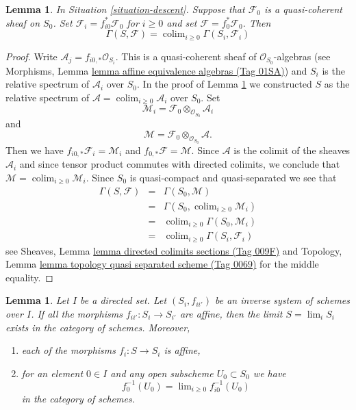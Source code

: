 \documentclass{amsart}
\theoremstyle{plain}
\newtheorem{lemma}[subsection]{Lemma}
\theoremstyle{definition}
\theoremstyle{remark}
\numberwithin{equation}{subsection}
\def\lim{\mathop{\mathrm{lim}}\nolimits}
\def\colim{\mathop{\mathrm{colim}}\nolimits}
\begin{document}
\begin{lemma}
\label{lemma-descend-section}
In Situation \ref{situation-descent}.
Suppose that $\mathcal{F}_0$ is a quasi-coherent sheaf on $S_0$.
Set $\mathcal{F}_i = f_{i0}^*\mathcal{F}_0$ for $i \geq 0$ and set
$\mathcal{F} = f_0^*\mathcal{F}_0$.
Then
$$
\Gamma(S, \mathcal{F}) = \colim_{i \geq 0} \Gamma(S_i, \mathcal{F}_i)
$$
\end{lemma}

\begin{proof}
Write $\mathcal{A}_j = f_{i0, *} \mathcal{O}_{S_i}$.
This is a quasi-coherent sheaf of $\mathcal{O}_{S_0}$-algebras
(see Morphisms, Lemma \href{https://stacks.math.columbia.edu/tag/01SA}{lemma affine equivalence algebras (Tag 01SA)})
and $S_i$ is the relative spectrum of $\mathcal{A}_i$ over $S_0$.
In the proof of Lemma \ref{lemma-directed-inverse-system-has-limit}
we constructed $S$ as the relative spectrum of
$\mathcal{A} = \colim_{i \geq 0} \mathcal{A}_i$
over $S_0$. Set
$$
\mathcal{M}_i = \mathcal{F}_0 \otimes_{\mathcal{O}_{S_0}} \mathcal{A}_i
$$
and
$$
\mathcal{M} = \mathcal{F}_0 \otimes_{\mathcal{O}_{S_0}} \mathcal{A}.
$$
Then we have $f_{i0, *} \mathcal{F}_i = \mathcal{M}_i$
and $f_{0, *}\mathcal{F} = \mathcal{M}$. Since $\mathcal{A}$
is the colimit of the sheaves $\mathcal{A}_i$ and since tensor
product commutes with directed colimits, we conclude that
$\mathcal{M} = \colim_{i \geq 0} \mathcal{M}_i$.
Since $S_0$ is quasi-compact and quasi-separated we see that
\begin{eqnarray*}
\Gamma(S, \mathcal{F})
& = &
\Gamma(S_0, \mathcal{M}) \\
& = &
\Gamma(S_0, \colim_{i \geq 0} \mathcal{M}_i) \\
& = &
\colim_{i \geq 0} \Gamma(S_0, \mathcal{M}_i) \\
& = &
\colim_{i \geq 0} \Gamma(S_i, \mathcal{F}_i)
\end{eqnarray*}
see Sheaves, Lemma \href{https://stacks.math.columbia.edu/tag/009F}{lemma directed colimits sections (Tag 009F)} and
Topology, Lemma \href{https://stacks.math.columbia.edu/tag/0069}{lemma topology quasi separated scheme (Tag 0069)}
for the middle equality.
\end{proof}


\begin{lemma}
\label{lemma-directed-inverse-system-has-limit}
Let $I$ be a directed set. Let $(S_i, f_{ii'})$ be an
inverse system of schemes over $I$. If all the morphisms
$f_{ii'} : S_i \to S_{i'}$ are affine, then the limit $S = \lim_i S_i$ exists
in the category of schemes. Moreover,
\begin{enumerate}
\item each of the morphisms $f_i : S \to S_i$ is affine,
\item for an element $0 \in I$ and any open subscheme $U_0 \subset S_0$
we have
$$
f_0^{-1}(U_0) = \lim_{i \geq 0} f_{i0}^{-1}(U_0)
$$
in the category of schemes.
\end{enumerate}
\end{lemma}
\end{document}
